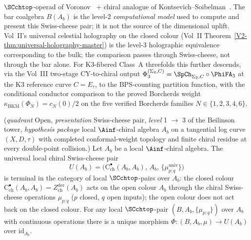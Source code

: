 \begin{remark}
\begin{enumerate}[label=\textup{(W\arabic*)}]
 $\SCchtop$-operad of Voronov~\cite{Voronov99} +
 chiral analogue of Kontsevich--Soibelman~\cite{KS00}.
 The bar coalgebra $B(A_b)$ is the level-2 \emph{computational model}
 used to compute and present this Swiss-cheese pair; it is not the
 source of the dimensional uplift.
 Vol~II's universal celestial holography on the closed colour
 (Vol~II Theorem~\ref{V2-thm:universal-holography-master}) is
 the level-3 holographic equivalence corresponding to the bulk;
 the comparison passes through Swiss-cheese, not through the
 bar alone.
 For K3-fibered Class~A threefolds this further descends, via the
 Vol~III two-stage CY-to-chiral output
 $\Phi_3^{(\Sigma_2, C)} = \SpCh_{\Sigma_2, C} \circ \PhiFA_3$ at the
 K3 reference curve $C = E_\tau$, to the BPS-counting partition
 function, with the conditional conductor comparison to the proved
 Borcherds weight $\kappa_{\mathrm{BKM}}(\Phi_N) = c_N(0)/2$ on the
 five verified Borcherds families $N \in \{1,2,3,4,6\}$.
\end{enumerate}
\end{remark}

\begin{theorem}
\label{thm:swiss-cheese-chiral-DT-feynman}
\textup{(}\emph{quadrant} Open, \emph{presentation} Swiss-cheese pair,
\emph{level} 1 $\to$ 3 of the Beilinson tower, \emph{hypothesis package}
local $\Ainf$-chiral algebra $A_b$ on a tangential log curve
$(X, D, \tau)$ with completed conformal-weight topology and finite
chiral residue at every double-point collision.\textup{)}
Let $A_b$ be a local $\Ainf$-chiral algebra. The universal local
chiral Swiss-cheese pair
\[
U(A_b) = \bigl(\mathrm{C}^\bullet_{\mathrm{ch}}(A_b, A_b),\, A_b,\,
\{\mu^{\mathrm{univ}}_{p;q}\}\bigr)
\]
is terminal in the category of local $\SCchtop$-pairs over $A_b$:
the closed colour $\mathrm{C}^\bullet_{\mathrm{ch}}(A_b, A_b)
= Z^{\mathrm{der}}_{\mathrm{ch}}(A_b)$ acts on the open colour $A_b$
through the chiral Swiss-cheese operations
$\mu_{p;q}$ \textup{(}$p$ closed, $q$ open inputs\textup{)}; the
open colour does not act back on the closed colour. For any local
$\SCchtop$-pair $(B, A_b, \{\mu_{p;q}\})$ over $A_b$ with continuous
operations there is a unique morphism
$\Phi \colon (B, A_b, \mu) \to U(A_b)$ over $\mathrm{id}_{A_b}$.
\end{theorem}

